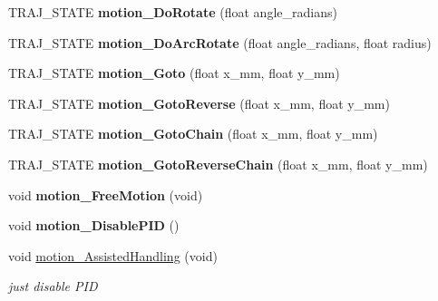 \begin{DoxyCompactItemize}
T\+R\+A\+J\+\_\+\+S\+T\+A\+TE {\bfseries motion\+\_\+\+Do\+Rotate} (float angle\+\_\+radians)
\item 
\mbox{\label{classAsservEsialR_a429c9c4a6008e27efe6d41ff0cb97288}} 
T\+R\+A\+J\+\_\+\+S\+T\+A\+TE {\bfseries motion\+\_\+\+Do\+Arc\+Rotate} (float angle\+\_\+radians, float radius)
\item 
\mbox{\label{classAsservEsialR_aff541fb741bcef0ae8be48fbf6c66d94}} 
T\+R\+A\+J\+\_\+\+S\+T\+A\+TE {\bfseries motion\+\_\+\+Goto} (float x\+\_\+mm, float y\+\_\+mm)
\item 
\mbox{\label{classAsservEsialR_a57df0bb16d2916c5cd161fa69034f3c8}} 
T\+R\+A\+J\+\_\+\+S\+T\+A\+TE {\bfseries motion\+\_\+\+Goto\+Reverse} (float x\+\_\+mm, float y\+\_\+mm)
\item 
\mbox{\label{classAsservEsialR_a85f69f82c1de14e25189941e7fb41a2b}} 
T\+R\+A\+J\+\_\+\+S\+T\+A\+TE {\bfseries motion\+\_\+\+Goto\+Chain} (float x\+\_\+mm, float y\+\_\+mm)
\item 
\mbox{\label{classAsservEsialR_abda7087d63c03f1a098bc1c4c117b178}} 
T\+R\+A\+J\+\_\+\+S\+T\+A\+TE {\bfseries motion\+\_\+\+Goto\+Reverse\+Chain} (float x\+\_\+mm, float y\+\_\+mm)
\item 
\mbox{\label{classAsservEsialR_a9f1de45d0cbdbd1d827e467b59fd4bc1}} 
void {\bfseries motion\+\_\+\+Free\+Motion} (void)
\item 
\mbox{\label{classAsservEsialR_af41648945c1353b9fc1fb07f77330646}} 
void {\bfseries motion\+\_\+\+Disable\+P\+ID} ()
\item 
\mbox{\label{classAsservEsialR_a6bcff182c51cf9de8c80f38f33267bae}} 
void \hyperlink{classAsservEsialR_a6bcff182c51cf9de8c80f38f33267bae}{motion\+\_\+\+Assisted\+Handling} (void)
\begin{DoxyCompactList}\small\item\em just disable P\+ID \end{DoxyCompactList}\item 
\mbox{\label{classAsservEsialR_adf00fba115e602267a590236182094ac}} 

\end{DoxyCompactItemize}
